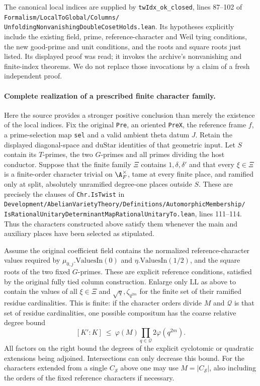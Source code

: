 The canonical local indices are supplied by
\texttt{twIdx\_ok\_closed}, lines 87--102 of
\texttt{Formalism/LocalToGlobal/Columns/}
\texttt{UnfoldingNonvanishingDoubleCosetHolds.lean}.
Its hypotheses explicitly include the existing field,
prime, reference-character and Weil tying conditions,
the new good-prime and unit conditions, and the roots
and square roots just listed.  Its displayed proof was
read; it invokes the archive's nonvanishing and finite-index
theorems.  We do not replace those invocations by a claim
of a fresh independent proof.

\paragraph{Complete realization of a prescribed finite character family.}
Here the source provides a stronger positive conclusion
than merely the existence of the local indices.  Fix the
original \texttt{Pre}, an oriented \texttt{PreX}, the
reference frame $f$, a prime-selection map \texttt{sel}
and a valid ambient theta datum $J$.  Retain the displayed
diagonal-space and $\mathrm{duStar}$ identities of that
geometric input.  Let $S$ contain its $T$-primes,
the two $G$-primes and all primes dividing the host
conductor.  Suppose that the finite family $\Xi$ contains
$1,\delta,\delta'$ and that every $\xi\in\Xi$ is a
finite-order character trivial on $\A_F^\times$, tame
at every finite place, and ramified only at split,
absolutely unramified degree-one places outside $S$.
These are precisely the clauses of \texttt{Chr.IsTwist}
in
\texttt{Development/AbelianVarietyTheory/Definitions/AutomorphicMembership/}
\texttt{IsRationalUnitaryDeterminantMapRationalUnitaryTo.lean},
lines 111--114.  Thus the characters constructed above
satisfy them whenever the main and auxiliary places
have been selected as stipulated.

Assume the original coefficient field contains the
normalized reference-character values required by
$\mu_{0,j}.\mathrm{ValuesIn}(0)$ and
$\eta.\mathrm{ValuesIn}(1/2)$, and the square roots
of the two fixed $G$-primes.  These are explicit reference
conditions, satisfied by the original fully tied
column construction.  Enlarge only $\mathrm{LL}$ as
above to contain the values of all $\xi\in\Xi$ and
$\sqrt q,\zeta_{q^{2m}}$ for the finite set of their
ramified residue cardinalities.  This is finite: if
the character orders divide $M$ and $\mathcal Q$ is
that set of residue cardinalities, one possible
compositum has the coarse relative degree bound
\[
 [K':K]\ \leq\ \varphi(M)
                   \prod_{q\in\mathcal Q}2\varphi(q^{2m}).
 \tag{A13o}
\]
All factors on the right bound the degrees of the
explicit cyclotomic or quadratic extensions being
adjoined.  Intersections can only decrease this bound.
For the characters extended from a single
$C_{\mathcal S}$ above one may use $M=|C_{\mathcal S}|$,
also including the orders of the fixed reference
characters if necessary.

